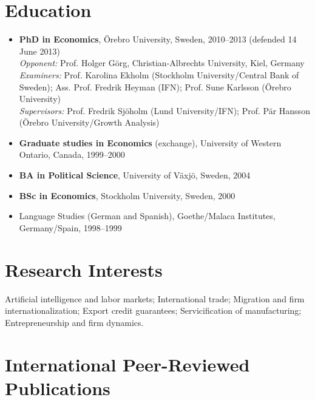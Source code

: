 \documentclass[11pt,a4paper]{article}
\newcommand{\cventry}[1]{\item #1}
\begin{document}
\section{Education}

\begin{itemize}
 \cventry{\textbf{PhD in Economics}, Örebro University, Sweden, 2010--2013 (defended 14 June 2013)\\
 \textit{Opponent:} Prof. Holger Görg, Christian-Albrechts University, Kiel, Germany\\
 \textit{Examiners:} Prof. Karolina Ekholm (Stockholm University/Central Bank of Sweden); Ass. Prof. Fredrik Heyman (IFN); Prof. Sune Karlsson (Örebro University)\\
 \textit{Supervisors:} Prof. Fredrik Sjöholm (Lund University/IFN); Prof. Pär Hansson (Örebro University/Growth Analysis)}
 \cventry{\textbf{Graduate studies in Economics} (exchange), University of Western Ontario, Canada, 1999--2000}
 \cventry{\textbf{BA in Political Science}, University of Växjö, Sweden, 2004}
 \cventry{\textbf{BSc in Economics}, Stockholm University, Sweden, 2000}
 \cventry{Language Studies (German and Spanish), Goethe/Malaca Institutes, Germany/Spain, 1998--1999}
\end{itemize}

\section{Research Interests}

Artificial intelligence and labor markets; International trade; Migration and firm internationalization; Export credit guarantees; Servicification of manufacturing; Entrepreneurship and firm dynamics.

\section{International Peer-Reviewed Publications}
\end{document}
